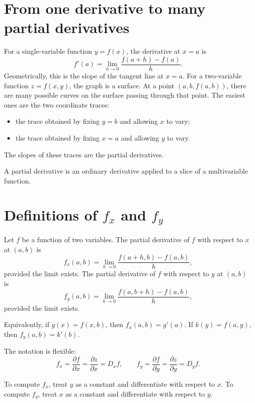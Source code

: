 \documentclass[11pt]{article}
\begin{document}
\section{From one derivative to many partial derivatives}

For a single-variable function $y=f(x)$, the derivative at $x=a$ is
\[
f'(a)=\lim_{h\to 0}\frac{f(a+h)-f(a)}{h}.
\]
Geometrically, this is the slope of the tangent line at $x=a$. For a two-variable function $z=f(x,y)$, the graph is a surface. At a point $(a,b,f(a,b))$, there are many possible curves on the surface passing through that point. The easiest ones are the two coordinate traces:
\begin{itemize}
  \item the trace obtained by fixing $y=b$ and allowing $x$ to vary;
  \item the trace obtained by fixing $x=a$ and allowing $y$ to vary.
\end{itemize}
The slopes of these traces are the partial derivatives.

\begin{importantbox}
A partial derivative is an ordinary derivative applied to a slice of a multivariable function.
\end{importantbox}

\section{Definitions of $f_x$ and $f_y$}

Let $f$ be a function of two variables. The partial derivative of $f$ with respect to $x$ at $(a,b)$ is
\[
f_x(a,b)=\lim_{h\to 0}\frac{f(a+h,b)-f(a,b)}{h},
\]
provided the limit exists. The partial derivative of $f$ with respect to $y$ at $(a,b)$ is
\[
f_y(a,b)=\lim_{h\to 0}\frac{f(a,b+h)-f(a,b)}{h},
\]
provided the limit exists.

Equivalently, if $g(x)=f(x,b)$, then $f_x(a,b)=g'(a)$. If $k(y)=f(a,y)$, then $f_y(a,b)=k'(b)$.

The notation is flexible:
\[
f_x=\frac{\partial f}{\partial x}=\frac{\partial z}{\partial x}=D_x f,
\qquad
f_y=\frac{\partial f}{\partial y}=\frac{\partial z}{\partial y}=D_y f.
\]

\begin{tipbox}
To compute $f_x$, treat $y$ as a constant and differentiate with respect to $x$. To compute $f_y$, treat $x$ as a constant and differentiate with respect to $y$.
\end{tipbox}
\end{document}
